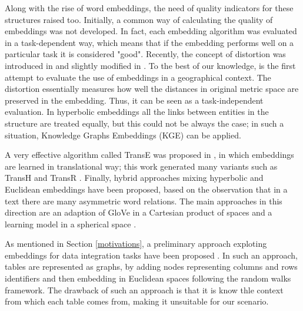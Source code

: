 Along with the rise of word embeddings, the need of quality indicators for these structures raised too. 
Initially, a common way of calculating the quality of embeddings was not developed. 
In fact, each embedding algorithm was evaluated in a task-dependent way, which means that if the embedding performs well on a particular task it is considered "good". 
Recently, the concept of distortion was introduced in \cite{sala2018representation} and slightly modified in \cite{dassereto2019evaluating}. 
To the best of our knowledge, \cite{dassereto2019evaluating} is the first attempt to evaluate the use of embeddings in a geographical context. 
The distortion essentially measures how well the distances in original metric space are preserved in the embedding. Thus, it can be seen as a task-independent evaluation. In hyperbolic embeddings all the links between entities in the structure are treated equally, but this could not be always the case; in such a situation, Knowledge Graphs Embeddings (KGE) can be applied. 

A very effective algorithm called TransE was proposed in \cite{bordes2013translating}, in which embeddings are learned in translational way; this work generated many variants such as TransH \cite{wang2014knowledge} and TransR \cite{lin2015learning}. 
Finally, hybrid approaches mixing hyperbolic and Euclidean embeddings have been proposed, based on the observation that in a text there are many asymmetric word relations. The main approaches in this direction are an adaption of GloVe in a Cartesian product of spaces \cite{tifrea2018poincare} and a learning model in a spherical space \cite{meng2019spherical}.  

As mentioned in Section \ref{motivations}, a preliminary approach exploting embeddings for data integration tasks have been proposed \cite{cappuzzo2020creating}. In such an approach, tables are represented as graphs, by adding nodes representing columns and rows identifiers and then embedding in Euclidean spaces following the random walks framework. The drawback of such an approach is that it is know thle context from which each table comes from, making it unsuitable for our scenario.
{\color{red}{AGGIUNGI Keynote PODS qua o sopra in motivations(meglio)}}


